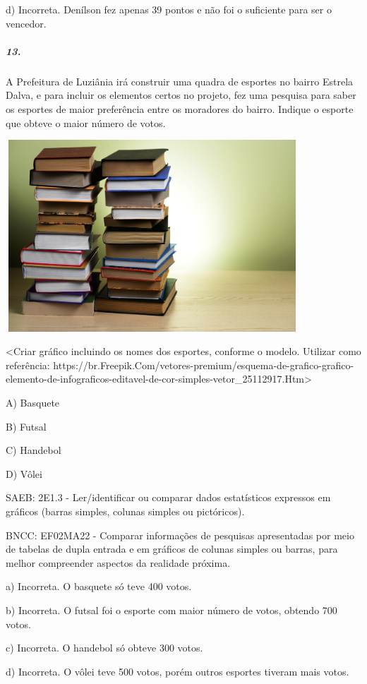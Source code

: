 d) Incorreta. Denílson fez apenas 39 pontos e não foi o suficiente para
ser o vencedor.

\subparagraph{13. }\label{section-112}

A Prefeitura de Luziânia irá construir uma quadra de esportes no bairro
Estrela Dalva, e para incluir os elementos certos no projeto, fez uma
pesquisa para saber os esportes de maior preferência entre os moradores
do bairro. Indique o esporte que obteve o maior número de votos.

\includegraphics[width=4.32292in,height=2.82791in]{media/image123.png}

\textless{}Criar gráfico incluindo os nomes dos esportes, conforme o
modelo. Utilizar como referência:
https://br.Freepik.Com/vetores-premium/esquema-de-grafico-grafico-elemento-de-infograficos-editavel-de-cor-simples-vetor\_25112917.Htm\textgreater{}

A) Basquete

B) Futsal

C) Handebol

D) Vôlei

SAEB: 2E1.3 - Ler/identificar ou comparar dados estatísticos expressos
em gráficos (barras simples, colunas simples ou pictóricos).

BNCC: EF02MA22 - Comparar informações de pesquisas apresentadas por meio
de tabelas de dupla entrada e em gráficos de colunas simples ou barras,
para melhor compreender aspectos da realidade próxima.

a) Incorreta. O basquete só teve 400 votos.

b) Incorreta. O futsal foi o esporte com maior número de votos, obtendo
700 votos.

c) Incorreta. O handebol só obteve 300 votos.

d) Incorreta. O vôlei teve 500 votos, porém outros esportes tiveram mais
votos.

